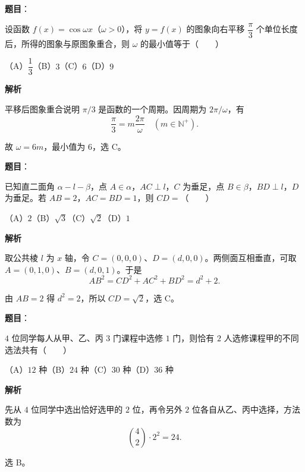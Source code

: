 \begin{answer}

\textbf{题目}：

设函数 $f(x)=\cos\omega x$（$\omega>0$），将 $y=f(x)$ 的图象向右平移 $\dfrac\pi3$ 个单位长度后，所得的图象与原图象重合，则 $\omega$ 的最小值等于\mbox{（　　）}

（A）$\dfrac13$\quad（B）$3$\quad（C）$6$\quad（D）$9$

\textbf{解析}

平移后图象重合说明 $\pi/3$ 是函数的一个周期。因周期为
$2\pi/\omega$，有
\nopagebreak[4]
\[
\frac{\pi}{3}=m\frac{2\pi}{\omega}\quad(m\in\mathbb N^+).
\]

故 $\omega=6m$，最小值为 $6$，选 C。


\end{answer}
\begin{answer}

\textbf{题目}：

已知直二面角 $\alpha-l-\beta$，点 $A\in\alpha$，$AC\perp l$，$C$ 为垂足，点 $B\in\beta$，$BD\perp l$，$D$ 为垂足。若 $AB=2$，$AC=BD=1$，则 $CD=$\mbox{（　　）}

（A）$2$\quad（B）$\sqrt3$\quad（C）$\sqrt2$\quad（D）$1$

\textbf{解析}

取公共棱 $l$ 为 $x$ 轴，令
$C=(0,0,0)$、$D=(d,0,0)$。两侧面互相垂直，可取
$A=(0,1,0)$、$B=(d,0,1)$。于是
\nopagebreak[4]
\[
AB^2=CD^2+AC^2+BD^2=d^2+2.
\]

由 $AB=2$ 得 $d^2=2$，所以 $CD=\sqrt2$，选 C。


\end{answer}
\begin{answer}

\textbf{题目}：

$4$ 位同学每人从甲、乙、丙 $3$ 门课程中选修 $1$ 门，则恰有 $2$ 人选修课程甲的不同选法共有\mbox{（　　）}

（A）$12$ 种\quad（B）$24$ 种\quad（C）$30$ 种\quad（D）$36$ 种

\textbf{解析}

先从 $4$ 位同学中选出恰好选甲的 $2$ 位，再令另外 $2$ 位各自从乙、丙中选择，方法数为
\nopagebreak[4]
\[
\binom42\cdot2^2=24.
\]

选 B。


\end{answer}
